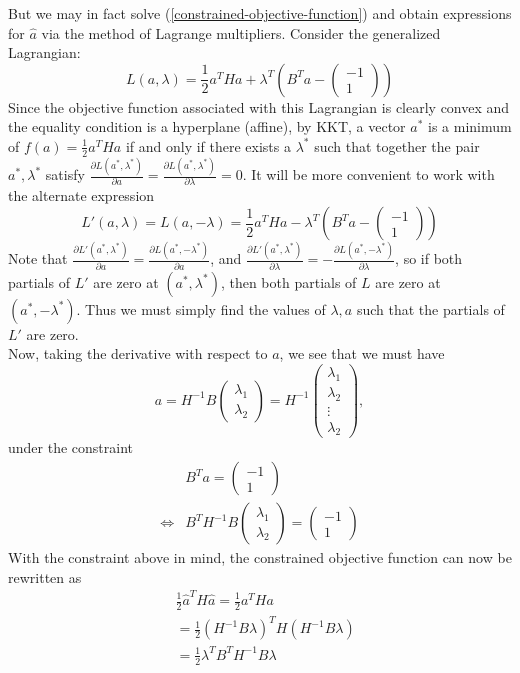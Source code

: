 \documentclass{article}
\theoremstyle{definition}
\theoremstyle{remark}
\numberwithin{equation}{section}
\begin{document}
But we may in fact solve (\ref{constrained-objective-function}) and obtain expressions for $\hat{a}$ via the method of Lagrange multipliers. Consider the generalized Lagrangian: 
\[ L(a,\lambda) = \frac{1}{2} a^T H a + \lambda^T (B^Ta - \begin{pmatrix} -1 \\ 1 \end{pmatrix} ) \]
Since the objective function associated with this Lagrangian is clearly convex and the equality condition is a hyperplane (affine), by KKT, a vector $a^*$ is a minimum of $f(a) = \frac{1}{2} a^T H a$ if and only if there exists a $\lambda^*$ such that together the pair $a^*, \lambda^*$ satisfy $\frac{\partial L(a^*,\lambda^*)}{\partial a} = \frac{\partial L(a^*,\lambda^*)}{\partial \lambda} = 0$. It will be more convenient to work with the alternate expression 
\[ L'(a,\lambda) = L(a,-\lambda) = \frac{1}{2} a^T H a - \lambda^T (B^Ta - \begin{pmatrix} -1 \\ 1 \end{pmatrix} ) \] 
Note that $\frac{\partial L'(a^*,\lambda^*)}{\partial a} = \frac{\partial L(a^*, -\lambda^*)}{\partial a}$, and $\frac{\partial L'(a^*,\lambda^*)}{\partial \lambda} = -\frac{\partial L(a^*, -\lambda^*)}{\partial \lambda}$, so if both partials of $L'$ are zero at $(a^*, \lambda^*)$, then both partials of $L$ are zero at $(a^*, -\lambda^*)$. Thus we must simply find the values of $\lambda, a$ such that the partials of $L'$ are zero. \\

Now, taking the derivative with respect to $a$, we see that we must have 
\[ a = H^{-1} B \begin{pmatrix} \lambda_1 \\ \lambda_2 \end{pmatrix} = H^{-1} \begin{pmatrix} \lambda_1 \\ \lambda_2 \\ \vdots \\ \lambda_2 \end{pmatrix},\]
under the constraint 
\begin{align*}
&B^Ta = \begin{pmatrix} -1 \\ 1 \end{pmatrix} \\
\iff &B^T H^{-1} B \begin{pmatrix}\lambda_1 \\ \lambda_2 \end{pmatrix} = \begin{pmatrix} -1 \\ 1 \end{pmatrix}
\end{align*} With the constraint above in mind, the constrained objective function can now be rewritten as 
\begin{align*}
& \frac{1}{2}\hat{a}^T H \hat{a} = \frac{1}{2}a^T Ha \\
&= \frac{1}{2}(H^{-1}B \lambda)^TH(H^{-1}B \lambda) \\
&= \frac{1}{2} \lambda^T B^T H^{-1}B \lambda
\end{align*}
\end{document}
